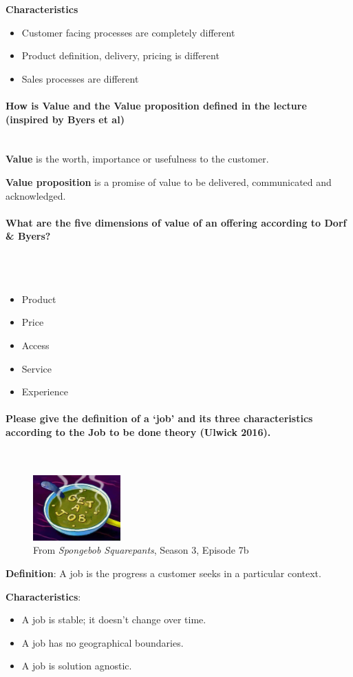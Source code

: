 \documentclass[10pt,a4paper,noendnumber=true]{scrartcl}
\newcommand{\properparagraph}[1]{\paragraph{\textcolor{Emerald}{#1}}\mbox{}\\}
\begin{document}
\textbf{Characteristics}
\begin{itemize}
	\item Customer facing processes are completely different
	\item Product definition, delivery, pricing is different
	\item Sales processes are different
\end{itemize}

\properparagraph{How is Value and the Value proposition defined in the lecture (inspired by Byers et al)}
\textbf{Value} is the worth, importance or usefulness to the customer.

\textbf{Value proposition} is a promise of value to be delivered, communicated and acknowledged.

\properparagraph{What are the five dimensions of value of an offering according to Dorf \& Byers?}
\\[-6ex]
\begin{itemize}
	\item Product
	\item Price
	\item Access
	\item Service
	\item Experience
\end{itemize}

\properparagraph{Please give the definition of a ‘job’ and its three characteristics according to the Job to be done theory (Ulwick 2016).}

\begin{figure}[H]
	\centering
	\includegraphics[width = 0.3\textwidth]{img/joob.jpg}
	\caption{From \textit{Spongebob Squarepants}, Season 3, Episode 7b}
\end{figure}

\textbf{Definition}: A job is the progress a customer seeks in a particular context.

\textbf{Characteristics}:
\begin{itemize}
	\item A job is stable; it doesn't change over time.
	\item A job has no geographical boundaries.
	\item A job is solution agnostic.
\end{itemize}
\end{document}
